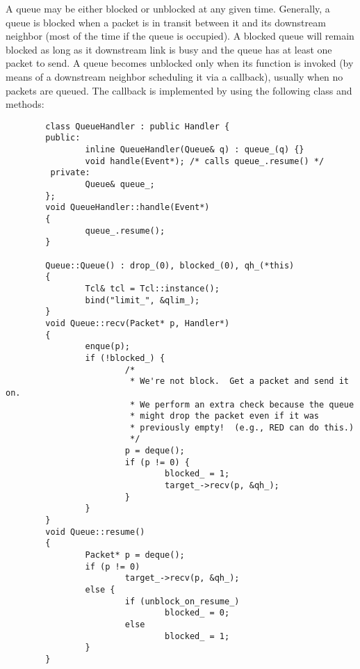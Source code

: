 A queue may be either blocked or unblocked at any given time.
Generally, a queue is blocked when a packet is in transit between it
and its downstream neighbor (most of the time if the queue is occupied).
A blocked queue will remain blocked as long as it downstream link is
busy and the queue has at least one packet to send.
A queue becomes unblocked only when its  function is
invoked (by means of a downstream neighbor scheduling it via
a callback), usually when no packets are queued.
The callback is implemented by using the following class and
methods:
\begin{small}
\begin{verbatim}
        class QueueHandler : public Handler {
        public:
                inline QueueHandler(Queue& q) : queue_(q) {}
                void handle(Event*); /* calls queue_.resume() */
         private:
                Queue& queue_;
        };
        void QueueHandler::handle(Event*)
        {
                queue_.resume();
        }

        Queue::Queue() : drop_(0), blocked_(0), qh_(*this)
        {
                Tcl& tcl = Tcl::instance();
                bind("limit_", &qlim_);
        }
        void Queue::recv(Packet* p, Handler*)
        {
                enque(p);
                if (!blocked_) {
                        /*
                         * We're not block.  Get a packet and send it on.
                         * We perform an extra check because the queue
                         * might drop the packet even if it was
                         * previously empty!  (e.g., RED can do this.)
                         */
                        p = deque();
                        if (p != 0) {
                                blocked_ = 1;
                                target_->recv(p, &qh_);
                        }
                }
        }
        void Queue::resume()
        {
                Packet* p = deque();
                if (p != 0)
                        target_->recv(p, &qh_);
                else {
                        if (unblock_on_resume_)
                                blocked_ = 0;
                        else
                                blocked_ = 1;
                }
        }
\end{verbatim}
\end{small}

